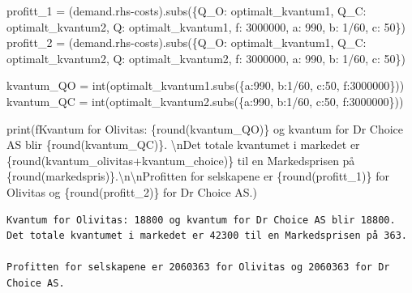 \documentclass[
  12pt,
  a4paper,
  DIV=11,
  numbers=noendperiod]{scrartcl}
\newenvironment{Shaded}{\begin{snugshade}}{\end{snugshade}}
\newcommand{\BuiltInTok}[1]{\textcolor[rgb]{0.00,0.23,0.31}{#1}}
\newcommand{\CharTok}[1]{\textcolor[rgb]{0.13,0.47,0.30}{#1}}
\newcommand{\DecValTok}[1]{\textcolor[rgb]{0.68,0.00,0.00}{#1}}
\newcommand{\NormalTok}[1]{\textcolor[rgb]{0.00,0.23,0.31}{#1}}
\newcommand{\OperatorTok}[1]{\textcolor[rgb]{0.37,0.37,0.37}{#1}}
\newcommand{\SpecialCharTok}[1]{\textcolor[rgb]{0.37,0.37,0.37}{#1}}
\newcommand{\SpecialStringTok}[1]{\textcolor[rgb]{0.13,0.47,0.30}{#1}}
\begin{document}
\begin{Shaded}
\begin{Highlighting}[]
\NormalTok{profitt\_1 }\OperatorTok{=}\NormalTok{ (demand.rhs}\OperatorTok{{-}}\NormalTok{costs).subs(\{Q\_O: optimalt\_kvantum1, Q\_C: optimalt\_kvantum2, Q: optimalt\_kvantum1, f: }\DecValTok{3000000}\NormalTok{, a: }\DecValTok{990}\NormalTok{, b: }\DecValTok{1}\OperatorTok{/}\DecValTok{60}\NormalTok{, c: }\DecValTok{50}\NormalTok{\}) }
\NormalTok{profitt\_2 }\OperatorTok{=}\NormalTok{ (demand.rhs}\OperatorTok{{-}}\NormalTok{costs).subs(\{Q\_O: optimalt\_kvantum1, Q\_C: optimalt\_kvantum2, Q: optimalt\_kvantum2, f: }\DecValTok{3000000}\NormalTok{, a: }\DecValTok{990}\NormalTok{, b: }\DecValTok{1}\OperatorTok{/}\DecValTok{60}\NormalTok{, c: }\DecValTok{50}\NormalTok{\})}



\NormalTok{kvantum\_QO }\OperatorTok{=} \BuiltInTok{int}\NormalTok{(optimalt\_kvantum1.subs(\{a:}\DecValTok{990}\NormalTok{, b:}\DecValTok{1}\OperatorTok{/}\DecValTok{60}\NormalTok{, c:}\DecValTok{50}\NormalTok{, f:}\DecValTok{3000000}\NormalTok{\}))}
\NormalTok{kvantum\_QC }\OperatorTok{=} \BuiltInTok{int}\NormalTok{(optimalt\_kvantum2.subs(\{a:}\DecValTok{990}\NormalTok{, b:}\DecValTok{1}\OperatorTok{/}\DecValTok{60}\NormalTok{, c:}\DecValTok{50}\NormalTok{, f:}\DecValTok{3000000}\NormalTok{\}))}

\BuiltInTok{print}\NormalTok{(}\SpecialStringTok{f\textquotesingle{}\textquotesingle{}\textquotesingle{}Kvantum for Olivitas: }\SpecialCharTok{\{}\BuiltInTok{round}\NormalTok{(kvantum\_QO)}\SpecialCharTok{\}}\SpecialStringTok{ og kvantum for Dr Choice AS blir }\SpecialCharTok{\{}\BuiltInTok{round}\NormalTok{(kvantum\_QC)}\SpecialCharTok{\}}\SpecialStringTok{. }\CharTok{\textbackslash{}n}\SpecialStringTok{Det totale kvantumet i markedet er }\SpecialCharTok{\{}\BuiltInTok{round}\NormalTok{(kvantum\_olivitas}\OperatorTok{+}\NormalTok{kvantum\_choice)}\SpecialCharTok{\}}\SpecialStringTok{ til en Markedsprisen på }\SpecialCharTok{\{}\BuiltInTok{round}\NormalTok{(markedspris)}\SpecialCharTok{\}}\SpecialStringTok{.}\CharTok{\textbackslash{}n\textbackslash{}n}\SpecialStringTok{Profitten for selskapene er }\SpecialCharTok{\{}\BuiltInTok{round}\NormalTok{(profitt\_1)}\SpecialCharTok{\}}\SpecialStringTok{ for Olivitas og }\SpecialCharTok{\{}\BuiltInTok{round}\NormalTok{(profitt\_2)}\SpecialCharTok{\}}\SpecialStringTok{ for Dr Choice AS.\textquotesingle{}\textquotesingle{}\textquotesingle{}}\NormalTok{)}
\end{Highlighting}
\end{Shaded}

\begin{verbatim}
Kvantum for Olivitas: 18800 og kvantum for Dr Choice AS blir 18800. 
Det totale kvantumet i markedet er 42300 til en Markedsprisen på 363.

Profitten for selskapene er 2060363 for Olivitas og 2060363 for Dr Choice AS.
\end{verbatim}
\end{document}
